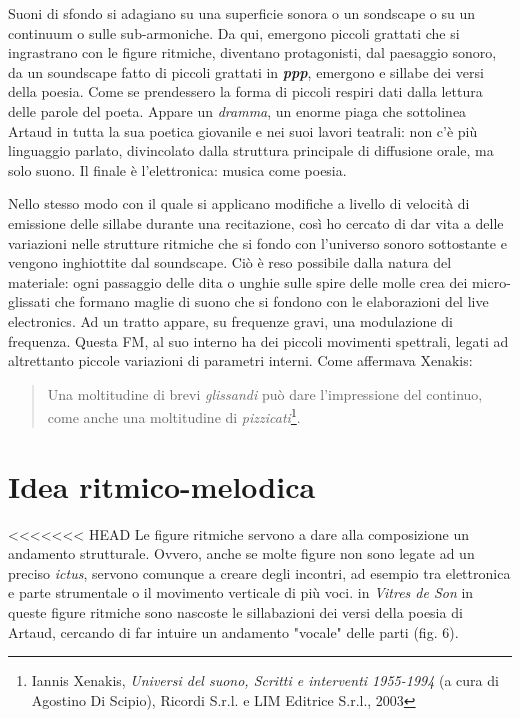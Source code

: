 Suoni di sfondo si adagiano su una superficie sonora o un sondscape o su un continuum o sulle sub-armoniche. Da qui, emergono piccoli grattati che si ingrastrano con le figure ritmiche, diventano protagonisti, dal paesaggio sonoro, da un soundscape fatto di piccoli grattati in \textbf{\textit{ppp}}, emergono e sillabe dei versi della poesia. Come se prendessero la forma di piccoli respiri dati dalla lettura delle parole del poeta. Appare un \textit{dramma}, un enorme piaga che sottolinea Artaud in tutta la sua poetica giovanile e nei suoi lavori teatrali: non c'è più linguaggio parlato, divincolato dalla struttura principale di diffusione orale, ma solo suono. Il finale è l'elettronica: musica come poesia.

Nello stesso modo con il quale si applicano modifiche a livello di velocità di emissione delle sillabe durante una recitazione, così ho cercato di dar vita a delle variazioni nelle strutture ritmiche che si fondo con l'universo sonoro sottostante e vengono inghiottite dal soundscape. Ciò è reso possibile dalla natura del materiale: ogni passaggio delle dita o unghie sulle spire delle molle crea dei micro-glissati che formano maglie di suono che si fondono con le elaborazioni del live electronics. Ad un tratto appare, su frequenze gravi, una modulazione di frequenza. Questa FM, al suo interno ha dei piccoli movimenti spettrali, legati ad altrettanto piccole variazioni di parametri interni. Come affermava Xenakis:

\begin{quotation}
Una moltitudine di brevi \textit{glissandi} può dare l'impressione del continuo, come anche una moltitudine di \textit{pizzicati}\footnote{Iannis Xenakis, \textit{Universi del suono, Scritti e interventi 1955-1994} (a cura di Agostino Di Scipio), Ricordi S.r.l. e LIM Editrice S.r.l., 2003}.
\end{quotation}

\section{Idea ritmico-melodica}

<<<<<<< HEAD
Le figure ritmiche servono a dare alla composizione un andamento strutturale. Ovvero, anche se molte figure non sono legate ad un preciso \textit{ictus}, servono comunque a creare degli incontri, ad esempio tra elettronica e parte strumentale o il movimento verticale di più voci. in \textit{Vitres de Son} in queste figure ritmiche sono nascoste le sillabazioni dei versi della poesia di Artaud, cercando di far intuire un andamento "vocale" delle parti (fig. 6).

